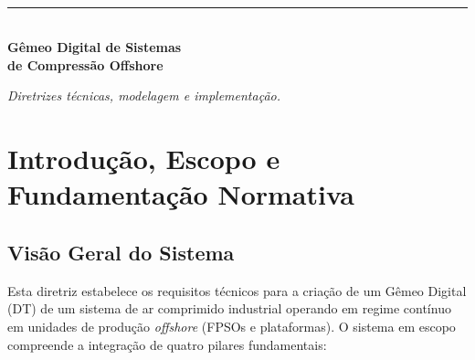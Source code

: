 \documentclass[12pt,a4paper]{article}
\numberwithin{equation}{section}
\numberwithin{table}{section}
\numberwithin{figure}{section}
\begin{document}
{\clearpage

\newpage


\clearpage
\thispagestyle{empty}
{}
\vspace*{\fill}
\begin{center}
	{\color{capaBlue}\sffamily\bfseries\Large{}}\\[3mm]
	{\color{capaOuro}\rule{42mm}{2.2pt}}\\[9mm]
	{\huge\bfseries Gêmeo Digital de Sistemas\\de Compressão Offshore}\\[7mm]
	\begin{minipage}{0.68\textwidth}
		\centering\itshape\small Diretrizes técnicas, modelagem e implementação.
	\end{minipage}
\end{center}
\vspace*{\fill}
\clearpage

\setcounter{section}{0}
\renewcommand{\theHsection}{v2.\arabic{section}}
\renewcommand{\theHequation}{v2.\theequation}
\renewcommand{\theHfigure}{v2.\thefigure}
\renewcommand{\theHtable}{v2.\thetable}
	
	
	
	
	

	\newpage
	\newpage



	\clearpage
	\section{\textbf{Introdução, Escopo e Fundamentação Normativa}}
	
	\subsection{\textbf{Visão Geral do Sistema}}
	Esta diretriz estabelece os requisitos técnicos para a criação de um Gêmeo Digital (DT) de um sistema de ar comprimido industrial operando em regime contínuo em unidades de produção \textit{offshore} (FPSOs e plataformas). O sistema em escopo compreende a integração de quatro pilares fundamentais:
	
}
\end{document}
